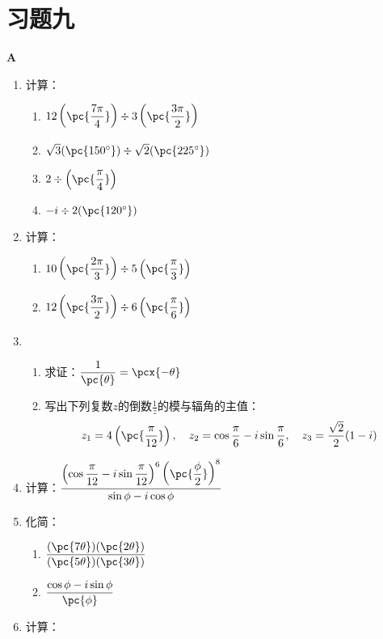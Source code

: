 \section*{习题九}
\begin{center}
\bfseries A
\end{center}
\begin{enumerate}
    \item 计算：
    \begin{enumerate}[(1)]
        \item $12\left(\pc{\frac{7\pi}{4}}\right)\div 3\left(\pc{\frac{3\pi}{2}}\right)$
        \item $\sqrt{3}(\pc{150^{\circ}})\div \sqrt{2}(\pc{225^{\circ}})$
        \item $2\div \left(\pc{\frac{\pi}{4}}\right)$
        \item $-i\div 2(\pc{120^{\circ}})$
    \end{enumerate}
    \item 计算：
    \begin{enumerate}[(1)]
        \item $10\left(\pc{\frac{2\pi}{3}}\right)\div 5\left(\pc{\frac{\pi}{3}}\right)$
        \item $12\left(\pc{\frac{3\pi}{2}}\right)\div 6\left(\pc{\frac{\pi}{6}}\right)$
    \end{enumerate}
    \item \begin{enumerate}[(1)]
        \item 求证：$\frac{1}{\pc{\theta}}=\pcx{-\theta}$
        \item 写出下列复数$z$的倒数$\frac{1}{z}$的模与辐角的主值：
\[z_1=4\left(\pc{\frac{\pi}{12}}\right),\quad z_2=\cos\frac{\pi}{6}-i\sin\frac{\pi}{6},\quad z_3=\frac{\sqrt{2}}{2}(1-i)\]
    \end{enumerate}
    \item 计算：$\frac{\left(\cos\frac{\pi}{12}-i\sin\frac{\pi}{12}\right)^6\left(\pc{\frac{\phi}{2}}\right)^8}{\sin\phi-i\cos\phi}$
    \item 化简： \begin{enumerate}[(1)]
        \item $\frac{(\pc{7\theta})(\pc{2\theta})}{(\pc{5\theta})(\pc{3\theta})}$
        \item $\frac{\cos\phi-i\sin\phi}{\pc{\phi}}$
    \end{enumerate}
    \item 计算：
\begin{multicols}{2}
    \begin{enumerate}[(1)]

\end{enumerate}
\end{multicols}
\end{enumerate}
